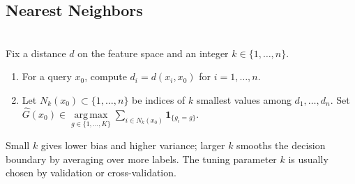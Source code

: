 \subsection{Nearest Neighbors}
\begin{method} \label{meth:sl-knn-classifier-metric-form} \\
Fix a distance $d$ on the feature space and an integer $k\in\{1,\ldots,n\}$.
\begin{enumerate}[label=(\roman*)]
\setlength{\itemsep}{0pt}
\item For a query $x_0$, compute $d_i=d(x_i,x_0)$ for $i=1,\ldots,n$.
\item Let $N_k(x_0)\subset\{1,\ldots,n\}$ be indices of $k$ smallest values among $d_1,\ldots,d_n$. Set $\widehat{G}(x_0)\in\operatorname*{arg\,max}\limits_{g\in\{1,\ldots,K\}}\sum\limits_{i\in N_k(x_0)}\mathbf{1}_{\{g_i=g\}}$.
\end{enumerate}
Small $k$ gives lower bias and higher variance; larger $k$ smooths the decision boundary by averaging over more labels. The tuning parameter $k$ is usually chosen by validation or cross-validation.
\end{method}

